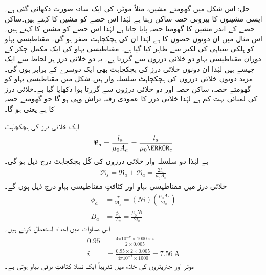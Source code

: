 حل:\quad
اس شکل میں گھومتے مشین، مثلاً موٹر، کی ایک سادہ صورت دکھائی گئی ہے۔ ایسی مشینوں کا بیرونی حصہ ساکن رہتا ہے لہٰذا اس حصے  کو مشین کا  کہتے ہیں۔ساکن حصے کے اندر مشین کا  گھومتا حصہ پایا جاتا ہے لہٰذا اس حصے کو مشین کا  کہتے ہیں۔ اس مثال میں ان دونوں حصوں کا    ہے لہٰذا ان کی ہچکچاہٹ صفر ہو گی۔ مقناطیسی بہاو  کو ہلکی سیاہی کی لکیر سے ظاہر کیا گیا ہے۔ مقناطیسی بہاو کی ایک مکمل چکر کے دوران مقناطیسی بہاو دو خلائی درزوں  سے گزرتا ہے۔ یہ دو خلائی درز ہر لحاظ سے ایک جیسے ہیں لہٰذا ان دونوں خلائی درز کی ہچکچاہٹ بھی ایک دوسرے کے برابر ہوں گی۔مزید دونوں خلائی درزوں کی ہچکچاہٹ سلسلہ وار ہیں۔شکل  میں مقناطیسی بہاو کو گھومتے حصہ، ساکن حصہ اور دو خلائی درزوں  سے گزرتا ہوا دکھایا گیا ہے۔خلائی درز کی لمبائی  بہت کم ہے لہٰذا خلائی درز کا عمودی رقبہ تراش  وہی ہو گا جو گھومتے حصہ کا ہے یعنی  ہو گا۔

ایک خلائی درز کی ہچکچاہٹ
\begin{align*}
\Re_a=\frac{l_a}{\mu_0 A_a}=\frac{l_a}{\mu_0 \A_c}
\end{align*}
ہے لہٰذا دو سلسلہ وار خلائی درزوں کی کُل ہچکچاہٹ درج ذیل ہو گی۔
\begin{align*}
\Re_s=\Re_a+\Re_a=\frac{2 l_a}{\mu_0 A_c}
\end{align*}
خلائی درز میں مقناطیسی بہاو  اور کثافتِ مقناطیسی بہاو  درج ذیل ہوں گے۔
\begin{align*}
\phi_a&=\frac{\tau}{\Re_s}=\left(N i \right) \left (\frac{\mu_0 A_c}{2 l_a} \right)\\
B_a&=\frac{\phi_a}{A_a}=\frac{\mu_0 N i}{2 l_a}
\end{align*}
اس مساوات میں اعداد استعمال کرتے ہیں۔
\begin{align*}
0.95&=\frac{4 \pi 10^{-7} \times 1000 \times i}{2 \times 0.005}\\
i&=\frac{0.95 \times 2 \times 0.005}{ 4 \pi 10^{-7} \times 1000}=\SI{7.56}{\ampere}
\end{align*}
موٹر اور جنریٹروں کی خلاء میں تقریباً ایک ٹسلا کثافتِ برقی بہاو ہوتی ہے۔

